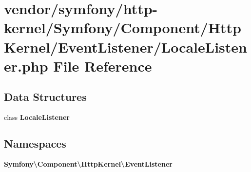 \section{vendor/symfony/http-\/kernel/\+Symfony/\+Component/\+Http\+Kernel/\+Event\+Listener/\+Locale\+Listener.php File Reference}
\label{_locale_listener_8php}
\subsection*{Data Structures}
\begin{DoxyCompactItemize}
\item 
class {\bf Locale\+Listener}
\end{DoxyCompactItemize}
\subsection*{Namespaces}
\begin{DoxyCompactItemize}
\item 
 {\bf Symfony\textbackslash{}\+Component\textbackslash{}\+Http\+Kernel\textbackslash{}\+Event\+Listener}
\end{DoxyCompactItemize}
